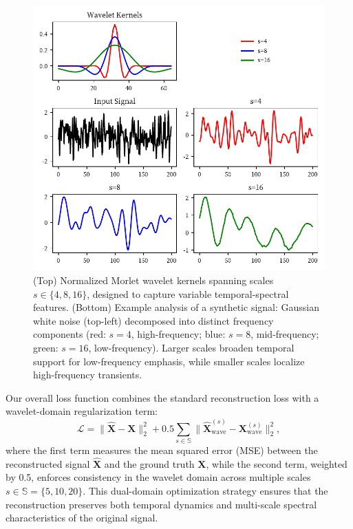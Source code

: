 \documentclass[conference]{IEEEtran}
\begin{document}
\begin{figure}[tb]
    \centering
    \includegraphics[width=0.9\linewidth]{wavelet-transform.pdf}
    \caption{(Top) Normalized Morlet wavelet kernels spanning scales \( s \in \{4, 8, 16\} \), designed to capture variable temporal-spectral features. (Bottom) Example analysis of a synthetic signal: Gaussian white noise (top-left) decomposed into distinct frequency components (red: \( s=4 \), high-frequency; blue: \( s=8 \), mid-frequency; green: \( s=16 \), low-frequency). Larger scales broaden temporal support for low-frequency emphasis, while smaller scales localize high-frequency transients.}
    \label{fig:wavelet-transform}
\end{figure}

Our overall loss function combines the standard reconstruction loss with a wavelet-domain regularization term:
\begin{equation}
    \mathcal{L} = \|\mathbf{\hat{X}} - \mathbf{X}\|_2^2 + 0.5\sum_{s\in\mathbb{S}} \|\mathbf{\hat{X}}_{\text{wave}}^{(s)} - \mathbf{X}_{\text{wave}}^{(s)}\|_2^2,
\end{equation}
where the first term measures the mean squared error (MSE) between the reconstructed signal $\mathbf{\hat{X}}$ and the ground truth $\mathbf{X}$, while the second term, weighted by 0.5, enforces consistency in the wavelet domain across multiple scales $s \in \mathbb{S} = \{5, 10, 20\}$. This dual-domain optimization strategy ensures that the reconstruction preserves both temporal dynamics and multi-scale spectral characteristics of the original signal.
\end{document}
